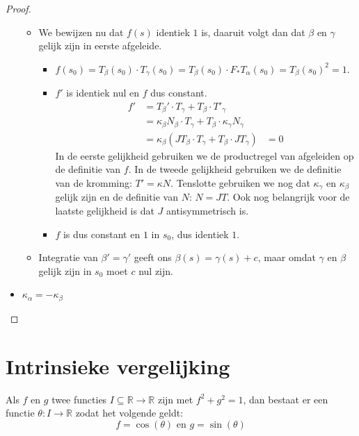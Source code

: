 \documentclass[main.tex]{subfiles}
\begin{document}
\begin{st}
\begin{proof}
\begin{itemize}
\begin{itemize}
    \item We bewijzen nu dat $f(s)$ identiek $1$ is, daaruit volgt dan dat $\beta$ en $\gamma$ gelijk zijn in eerste afgeleide.
      \begin{itemize}
      \item $f(s_{0}) = T_{\beta}(s_{0}) \cdot T_{\gamma}(s_{0}) = T_{\beta}(s_{0}) \cdot F_{*}T_{\alpha}(s_{0}) = T_{\beta}(s_{0})^{2} = 1$.
      \item $f'$ is identiek nul en $f$ dus constant.
        \[
        \begin{array}{rll}
          f' &= T_{\beta}'\cdot T_{\gamma} + T_{\beta}\cdot T'_{\gamma}\\
             &= \kappa_{\beta}N_{\beta} \cdot T_{\gamma} + T_{\beta} \cdot \kappa_{\gamma}N_{\gamma}\\
             &= \kappa_{\beta}(JT_{\beta} \cdot T_{\gamma} + T_{\beta} \cdot JT_{\gamma})
             &= 0
        \end{array}
        \]
        In de eerste gelijkheid gebruiken we de productregel van afgeleiden op de definitie van $f$.
        In de tweede gelijkheid gebruiken we de definitie van de kromming: $T' = \kappa N$.
        Tenslotte gebruiken we nog dat $\kappa_{\gamma}$ en $\kappa_{\beta}$ gelijk zijn en de definitie van $N$: $N=JT$.
        Ook nog belangrijk voor de laatste gelijkheid is dat $J$ antisymmetrisch is.
      \item $f$ is dus constant en $1$ in $s_{0}$, dus identiek $1$.
      \end{itemize}

    \item Integratie van $\beta'=\gamma'$ geeft ons $\beta(s) =\gamma(s) + c$, maar omdat $\gamma$ en $\beta$ gelijk zijn in $s_{0}$ moet $c$ nul zijn.
    \end{itemize}

    \item $\kappa_{\alpha} = - \kappa_{\beta}$\\
    \end{itemize}
  \end{proof}
\end{st}

\section{Intrinsieke vergelijking}
\label{sec:intr-verg}

\begin{lem}
  Als $f$ en $g$ twee functies $I \subseteq \mathbb{R} \rightarrow \mathbb{R}$ zijn met $f^{2}+g^{2} = 1$, dan bestaat er een functie $\theta: I \rightarrow \mathbb{R}$ zodat het volgende geldt:
  \[ f = \cos(\theta) \text{ en } g = \sin(\theta) \]
\end{lem}
\end{document}
